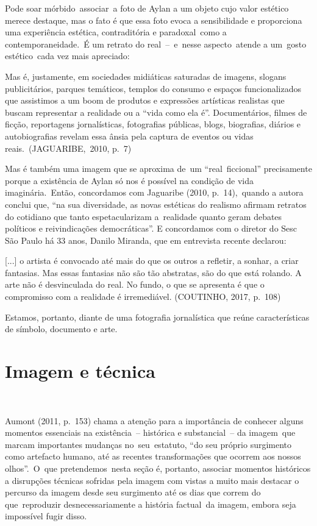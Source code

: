 \documentclass[
  letterpaper,
  a4paper,
  12pt]{scrbook}
\renewenvironment{quote}
  {\par\singlespacing\small\list{}{\rightmargin=0cm \leftmargin=4cm}%
   \item\relax}
  {\endlist}
\begin{document}
Pode soar mórbido~associar~a foto de Aylan a um objeto cujo valor
estético merece destaque, mas o fato é que essa foto evoca a
sensibilidade e proporciona uma experiência estética, contraditória e
paradoxal~como a contemporaneidade.~É um retrato do real~--~e~nesse
aspecto~atende a um~gosto estético~cada vez mais apreciado:~ ~

\begin{quote}
Mas é, justamente, em sociedades midiáticas saturadas de imagens,
slogans publicitários, parques temáticos, templos do consumo e espaços
funcionalizados que assistimos a um boom de produtos e expressões
artísticas realistas que buscam representar a realidade ou a ``vida como
ela é''. Documentários, filmes de ficção, reportagens jornalísticas,
fotografias públicas, blogs, biografias, diários e autobiografias
revelam essa ânsia pela captura de eventos ou vidas
reais.~(JAGUARIBE,~2010, p.~7)~
\end{quote}

Mas é também uma imagem que se aproxima de~um ``real~ficcional''
precisamente porque a existência de Aylan só nos é possível na condição
de vida imaginária.~Então, concordamos com Jaguaribe (2010,
p.~14),~quando a autora conclui que, ``na sua diversidade, as novas
estéticas do realismo afirmam retratos do cotidiano que tanto
espetacularizam a~realidade quanto geram debates políticos e
reivindicações democráticas''. E concordamos com o diretor do Sesc São
Paulo há 33 anos, Danilo Miranda, que em entrevista recente declarou:

\begin{quote}
{[}...{]} o artista é convocado até mais do que os outros a refletir, a
sonhar, a criar fantasias. Mas essas fantasias não são tão abstratas,
são do que está rolando. A arte não é desvinculada do real. No fundo, o
que se apresenta é que o compromisso com a realidade é irremediável.
(COUTINHO, 2017, p.~108)
\end{quote}

Estamos, portanto, diante de uma fotografia jornalística que reúne
características de símbolo, documento e arte. ~

\hypertarget{imagem-e-tuxe9cnica}{%
\section{Imagem e técnica}\label{imagem-e-tuxe9cnica}}

~

Aumont (2011, p.~153) chama a atenção para a importância de conhecer
alguns momentos essenciais na existência~-- histórica e substancial~--
da imagem~que marcam importantes mudanças no~seu~estatuto, ``do seu
próprio surgimento como artefacto humano, até as recentes transformações
que ocorrem aos nossos olhos''.~O~que pretendemos~nesta seção é,
portanto, associar momentos históricos a disrupções técnicas sofridas
pela imagem com vistas a muito mais destacar o percurso da imagem desde
seu surgimento até os dias que correm do que~reproduzir
desnecessariamente a história factual~da imagem, embora seja impossível
fugir disso.~
\end{document}
